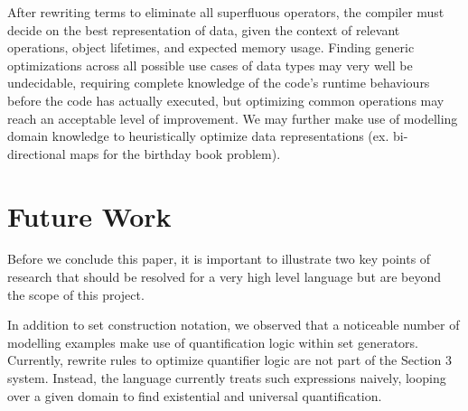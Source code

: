 \documentclass{article}
\begin{document}


After rewriting terms to eliminate all superfluous operators, the compiler must decide on the best representation of data, given the context of relevant operations, object lifetimes, and expected memory usage. Finding generic optimizations across all possible use cases of data types may very well be undecidable, requiring complete knowledge of the code's runtime behaviours before the code has actually executed, but optimizing common operations may reach an acceptable level of improvement. We may further make use of modelling domain knowledge to heuristically optimize data representations (ex. bi-directional maps for the birthday book problem).

\section{Future Work}

Before we conclude this paper, it is important to illustrate two key points of research that should be resolved for a very high level language but are beyond the scope of this project.

In addition to set construction notation, we observed that a noticeable number of modelling examples make use of quantification logic within set generators. Currently, rewrite rules to optimize quantifier logic are not part of the Section 3 system. Instead, the language currently treats such expressions naively, looping over a given domain to find existential and universal quantification.
\end{document}
